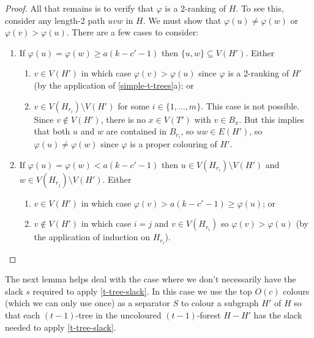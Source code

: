 \documentclass[kpfonts]{patmorin}
\theoremstyle{named}
\newcommand{\weirdref}[2]{\cref{#1}#2}
\begin{document}
\begin{proof}
   All that remains is to verify that $\varphi$ is a 2-ranking of $H$. To see this, consider any length-2 path $uvw$ in $H$.  We must show that $\varphi(u)\neq \varphi(w)$ or $\varphi(v)>\varphi(u)$.  There are a few cases to consider:
   \begin{enumerate}
    \item If $\varphi(u)=\varphi(w) \ge a(k-c'-1)$ then $\{u,w\}\subseteq V(H')$. Either
    \begin{enumerate}
       \item $v\in V(H')$ in which case $\varphi(v)>\varphi(u)$ since $\varphi$ is a 2-ranking of $H'$ (by the application of \weirdref{simple-t-trees}{a}); or
       \item $v\in V(H_{r_i})\setminus V(H')$ for some $i\in\{1,\ldots,m\}$.  This case is not possible.  Since $v\not\in V(H')$, there is no $x\in V(T')$ with $v\in B_x$.  But this implies that both $u$ and $w$ are contained in $B_{r_i}$, so $uw\in E(H')$, so $\varphi(u)\neq\varphi(w)$ since $\varphi$ is a proper colouring of $H'$.
   \end{enumerate}
   \item If $\varphi(u)=\varphi(w) < a(k-c'-1)$ then $u\in V(H_{r_i})\setminus V(H')$ and $w\in V(H_{r_j})\setminus V(H')$.  Either
   \begin{enumerate}
    \item $v\in V(H')$ in which case $\varphi(v)>a(k-c'-1)\ge\varphi(u)$; or
    \item $v\not\in V(H')$ in which case $i=j$ and $v\in V(H_{r_i})$ so $\varphi(v)>\varphi(u)$ (by the application of induction on $H_{r_i}$). \qedhere
    \end{enumerate}
   \end{enumerate}
\end{proof}

The next lemma helps deal with the case where we don't necessarily have the slack $s$ required to apply \cref{t-tree-slack}.  In this case we use the top $O(c)$ colours (which we can only use once) as a separator $S$ to colour a subgraph $H'$ of $H$ so that each $(t-1)$-tree in the uncoloured $(t-1)$-forest $H-H'$ has the slack needed to apply \cref{t-tree-slack}.
\end{document}

